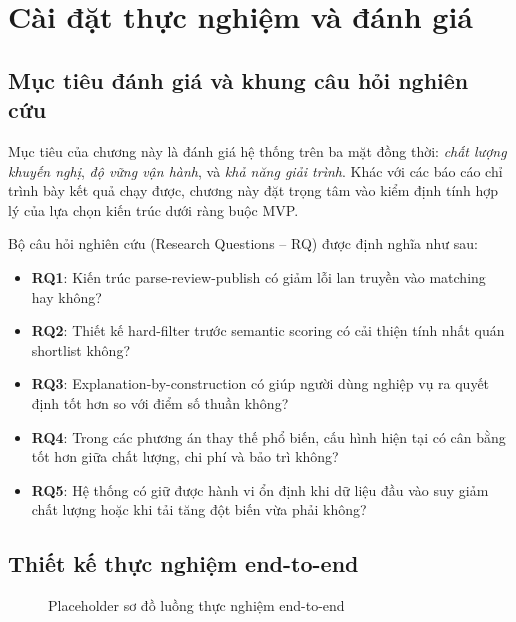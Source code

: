 \chapter{Cài đặt thực nghiệm và đánh giá}

\section{Mục tiêu đánh giá và khung câu hỏi nghiên cứu}

Mục tiêu của chương này là đánh giá hệ thống trên ba mặt đồng thời: \textit{chất lượng khuyến nghị}, \textit{độ vững vận hành}, và \textit{khả năng giải trình}. Khác với các báo cáo chỉ trình bày kết quả chạy được, chương này đặt trọng tâm vào kiểm định tính hợp lý của lựa chọn kiến trúc dưới ràng buộc MVP.

Bộ câu hỏi nghiên cứu (Research Questions -- RQ) được định nghĩa như sau:

\begin{itemize}
  \item \textbf{RQ1}: Kiến trúc parse-review-publish có giảm lỗi lan truyền vào matching hay không?
  \item \textbf{RQ2}: Thiết kế hard-filter trước semantic scoring có cải thiện tính nhất quán shortlist không?
  \item \textbf{RQ3}: Explanation-by-construction có giúp người dùng nghiệp vụ ra quyết định tốt hơn so với điểm số thuần không?
  \item \textbf{RQ4}: Trong các phương án thay thế phổ biến, cấu hình hiện tại có cân bằng tốt hơn giữa chất lượng, chi phí và bảo trì không?
  \item \textbf{RQ5}: Hệ thống có giữ được hành vi ổn định khi dữ liệu đầu vào suy giảm chất lượng hoặc khi tải tăng đột biến vừa phải không?
\end{itemize}

\section{Thiết kế thực nghiệm end-to-end}

\begin{figure}[H]
\centering
{}
\caption{Placeholder sơ đồ luồng thực nghiệm end-to-end}
\label{fig:experiment-flow-placeholder}
\end{figure}

